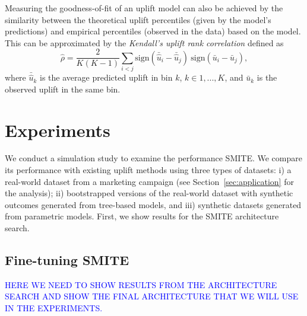 \documentclass{article}
\begin{document}
Measuring the goodness-of-fit of an uplift model can also be achieved by the similarity between the theoretical uplift percentiles (given by the model's predictions) and empirical percentiles (observed in the data) based on the model. This can be approximated by the {\it Kendall's uplift rank correlation} \citep{belba2019qbased} defined as
\begin{equation}
    \hat{\rho} = \frac{2}{K(K-1)} \sum_{i<j} \mathrm{sign}(\bar{\hat{u}}_i - \bar{\hat{u}}_j)~\mathrm{sign}(\bar{u}_i - \bar{u}_j),
    \label{eq:corr_coeff}
\end{equation}
where $\bar{\hat{u}}_k$ is the average predicted uplift in bin $k$,  $k \in {1,...,K}$, and $\bar{u}_k$ is the observed uplift in the same bin. 




\section{Experiments}
\label{sec:experiments}

We conduct a simulation study to examine the performance SMITE. We compare its performance with existing uplift methods using three types of datasets: i) a real-world dataset from a marketing campaign (see Section~\ref{sec:application} for the analysis); ii) bootstrapped versions of the real-world dataset with synthetic outcomes generated from tree-based models, and iii) synthetic datasets generated from parametric models. First, we show results for the SMITE architecture search.

\subsection{Fine-tuning SMITE}

\textcolor{blue}{HERE WE NEED TO SHOW RESULTS FROM THE ARCHITECTURE SEARCH AND SHOW THE FINAL ARCHITECTURE THAT WE WILL USE IN THE EXPERIMENTS.}
\end{document}
